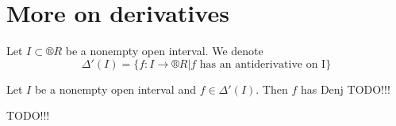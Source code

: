 \documentclass[12pt]{article}					%
\begin{document}
\section{More on derivatives}
\begin{definice}[Notation]
	Let $I \subset ®R$ be a nonempty open interval. We denote
	$$ Δ'(I) = \{f: I \rightarrow ®R | f \text{ has an antiderivative on I}\} $$
\end{definice}

\begin{veta}
	Let $I$ be a nonempty open interval and $f \in Δ'(I)$. Then $f$ has Denj TODO!!!
\end{veta}

TODO!!!
\end{document}
